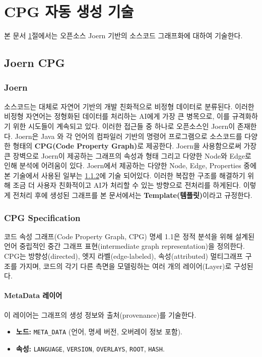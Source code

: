 \clearpage

\section{CPG 자동 생성 기술}\label{sec:cpg}

본 문서 \ref{sec:cpg}절에서는 오픈소스 Joern 기반의 소스코드 그래프화에 대하여 기술한다.

\subsection{Joern CPG}

\subsubsection{Joern}
소스코드는 대체로 자연어 기반의 개발 친화적으로 비정형 데이터로 분류된다.
이러한 비정형 자연어는 정형화된 데이터를 처리하는 AI에게 가장 큰 병목으로, 이를 규격화하기 위한 시도들이 계속되고 있다.
이러한 접근들 중 하나로 오픈소스인 Joern이 존재한다.
Joern은 Java 와 각 언어의 컴파일러 기반의 명령어 프로그램으로 소스코드를 다양한 형태의 \textbf{CPG(Code Property Graph)}로 제공한다.
Joern을 사용함으로써 가장 큰 장벽으로 Joern이 제공하는 그래프의 속성과 형태 그리고 다양한 Node와 Edge로 인해 분석에 어려움이 있다.
Joern에서 제공하는 다양한 Node, Edge, Properties 중에 본 기술에서 사용된 일부는 \ref{subsubsec:cpgspec}에 기술 되어있다.
이러한 복잡한 구조를 해결하기 위해 조금 더 사용자 친화적이고 AI가 처리할 수 있는 방향으로 전처리를 하게된다.
이렇게 전처리 후에 생성된 그래프를 본 문서에서는 \textbf{Template(템플릿)}이라고 규정한다.

\subsubsection{CPG Specification}\label{subsubsec:cpgspec}
코드 속성 그래프(Code Property Graph, CPG) 명세 1.1은 정적 분석을 위해 설계된 언어 중립적인 중간 그래프 표현(intermediate graph representation)을 정의한다. CPG는 방향성(directed), 엣지 라벨(edge-labeled), 속성(attributed) 멀티그래프 구조를 가지며, 코드의 각기 다른 측면을 모델링하는 여러 개의 레이어(Layer)로 구성된다.

\paragraph{MetaData 레이어} 이 레이어는 그래프의 생성 정보와 출처(provenance)를 기술한다.
\begin{itemize} \setlength{\itemsep}{0pt} \setlength{\parskip}{0pt} \setlength{\topsep}{0pt} \setlength{\partopsep}{0pt}
    \item \textbf{노드:} \texttt{META\_DATA} (언어, 명세 버전, 오버레이 정보 포함).
    \item \textbf{속성:} \texttt{LANGUAGE}, \texttt{VERSION}, \texttt{OVERLAYS}, \texttt{ROOT}, \texttt{HASH}.
\end{itemize}

